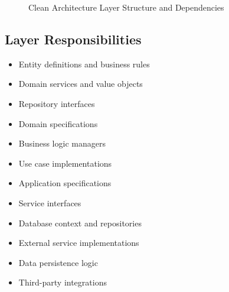 \documentclass[12pt,a4paper]{article}
\begin{document}
\begin{figure}[H]
    \caption{Clean Architecture Layer Structure and Dependencies}
\end{figure}

\subsection{Layer Responsibilities}

\begin{tcolorbox}[colback=lightgray, colframe=primaryblue, title=Domain Layer (Core)]
    \begin{itemize}
        \item Entity definitions and business rules
        \item Domain services and value objects
        \item Repository interfaces
        \item Domain specifications
    \end{itemize}
\end{tcolorbox}

\begin{tcolorbox}[colback=lightgray, colframe=secondarygreen, title=Application Layer]
    \begin{itemize}
        \item Business logic managers
        \item Use case implementations
        \item Application specifications
        \item Service interfaces
    \end{itemize}
\end{tcolorbox}

\begin{tcolorbox}[colback=lightgray, colframe=warningyellow, title=Infrastructure Layer]
    \begin{itemize}
        \item Database context and repositories
        \item External service implementations
        \item Data persistence logic
        \item Third-party integrations
    \end{itemize}
\end{tcolorbox}
\end{document}
